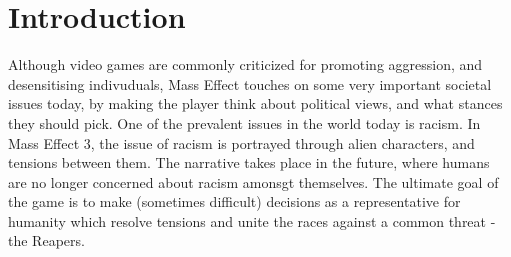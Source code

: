 \documentclass[journal]{IEEEtran}
\begin{document}
%
%
%
\normalsize
\section{Introduction}
Although video games are commonly criticized for promoting aggression, and desensitising indivuduals, Mass Effect touches on some very important societal issues today, by making the player think about political views,
and what stances they should pick. One of the prevalent issues in the world today is racism. In Mass Effect 3, the issue of racism is portrayed through alien characters, and tensions between them. The narrative takes place in the future, where humans are no longer concerned about racism amonsgt themselves. The ultimate goal of the game is to make (sometimes difficult) decisions as a representative for humanity which resolve tensions and unite the races against a common threat -the Reapers.
\end{document}
